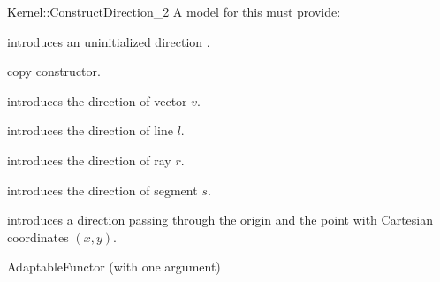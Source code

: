 \begin{ccRefFunctionObjectConcept}{Kernel::ConstructDirection_2}
A model for this must provide:



\ccHidden {}
             {introduces an uninitialized direction .}

\ccHidden {}
            {copy constructor.}

            {introduces the direction of vector $v$.}

            {introduces the direction of line $l$.}

            {introduces the direction of ray $r$.}

            {introduces the direction of segment $s$.}

\ccHidden{}
            {introduces a direction  passing through the origin
             and the point with Cartesian coordinates $(x, y)$.}

\ccRefines
AdaptableFunctor (with one argument)

\ccSeeAlso

  \\

\end{ccRefFunctionObjectConcept}
